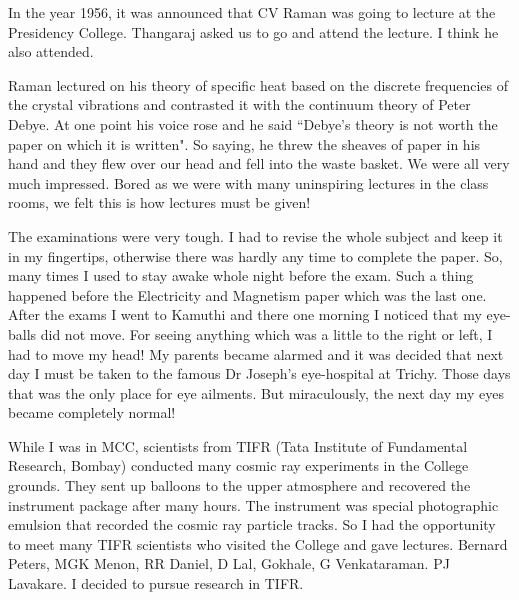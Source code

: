 \vspace{.1cm}

In the year 1956, it was announced that CV Raman was going to lecture at 
the Presidency College. Thangaraj asked us to go and attend the lecture. 
I think he also attended.

\vspace{.1cm}

Raman lectured on his theory of specific heat based on the discrete 
frequencies of the crystal vibrations and contrasted it with the 
continuum theory of Peter Debye. At one point his voice rose and he said 
``Debye's theory is not worth the paper on which it is written". So 
saying, he threw the sheaves of paper in his hand and they flew over our 
head and fell into the waste basket. We were all very much impressed. 
Bored as we were with many uninspiring lectures in the class rooms, we 
felt this is how lectures must be given!

\vspace{.1cm}

The examinations were very tough. I had to revise the whole subject and 
keep it in my fingertips, otherwise there was hardly any time to 
complete the paper. So, many times I used to stay awake whole night 
before the exam. Such a thing happened before the Electricity and 
Magnetism paper which was the last one. After the exams I went to 
Kamuthi and there one morning I noti\-ced that my eye-balls did not move. 
For seeing anything which was a little to the right or left, I had to 
move my head! My pa\-rents became alarmed and it was decided that next day 
I must be taken to the famous Dr Joseph's eye-hospital at Trichy. Those 
days that was the only place for eye ailments. But miraculously, the 
next day my eyes became completely normal!

\vspace{.1cm}

While I was in MCC, scientists from TIFR (Tata Institute of Fundamental 
Research, Bombay) conducted many cosmic ray experiments in the College 
grounds. They sent up balloons to the upper atmosphere and recovered the 
instrument package after many hours. The instrument was special 
photographic emulsion that recorded the cosmic ray particle tracks. So I 
had the opportunity to meet many TIFR scientists who visited the Co\-llege 
and gave lectures. Bernard Peters, MGK Menon, RR Daniel, D Lal, Gokhale, 
G Venkataraman. PJ Lavakare. I decided to pursue research in TIFR.

\vspace{.1cm}

